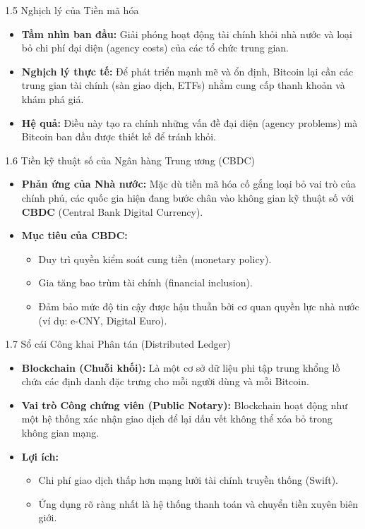 \documentclass[aspectratio=169]{beamer}
\begin{document}
\begin{frame}{1.5 Nghịch lý của Tiền mã hóa}
    \begin{itemize}
        \item \textbf{Tầm nhìn ban đầu:} Giải phóng hoạt động tài chính khỏi nhà nước và loại bỏ chi phí đại diện (agency costs) của các tổ chức trung gian.
        \item \textbf{Nghịch lý thực tế:} Để phát triển mạnh mẽ và ổn định, Bitcoin lại cần các trung gian tài chính (sàn giao dịch, ETFs) nhằm cung cấp thanh khoản và khám phá giá.
        \item \textbf{Hệ quả:} Điều này tạo ra chính những vấn đề đại diện (agency problems) mà Bitcoin ban đầu được thiết kế để tránh khỏi.
    \end{itemize}
\end{frame}

\begin{frame}{1.6 Tiền kỹ thuật số của Ngân hàng Trung ương (CBDC)}
    \begin{itemize}
        \item \textbf{Phản ứng của Nhà nước:} Mặc dù tiền mã hóa cố gắng loại bỏ vai trò của chính phủ, các quốc gia hiện đang bước chân vào không gian kỹ thuật số với \textbf{CBDC} (Central Bank Digital Currency).
        \item \textbf{Mục tiêu của CBDC:}
        \begin{itemize}
            \item Duy trì quyền kiểm soát cung tiền (monetary policy).
            \item Gia tăng bao trùm tài chính (financial inclusion).
            \item Đảm bảo mức độ tin cậy được hậu thuẫn bởi cơ quan quyền lực nhà nước (ví dụ: e-CNY, Digital Euro).
        \end{itemize}
    \end{itemize}
\end{frame}

\begin{frame}{1.7 Sổ cái Công khai Phân tán (Distributed Ledger)}
    \begin{itemize}
        \item \textbf{Blockchain (Chuỗi khối):} Là một cơ sở dữ liệu phi tập trung khổng lồ chứa các định danh đặc trưng cho mỗi người dùng và mỗi Bitcoin.
        \item \textbf{Vai trò Công chứng viên (Public Notary):} Blockchain hoạt động như một hệ thống xác nhận giao dịch để lại dấu vết không thể xóa bỏ trong không gian mạng.
        \item \textbf{Lợi ích:}
        \begin{itemize}
            \item Chi phí giao dịch thấp hơn mạng lưới tài chính truyền thống (Swift).
            \item Ứng dụng rõ ràng nhất là hệ thống thanh toán và chuyển tiền xuyên biên giới.
        \end{itemize}
    \end{itemize}
\end{frame}
\end{document}
